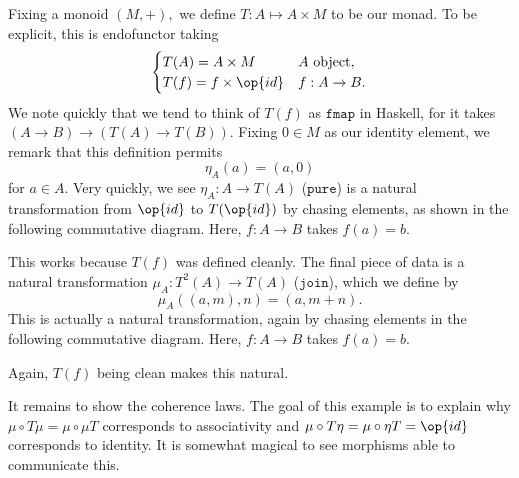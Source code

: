 Fixing a monoid $(M,+),$ we define $T:A\mapsto A\times M$ to be our monad. To be explicit, this is endofunctor taking
\[\begin{cases}
    T(A)=A\times M & A\text{ object}, \\
    T(f)=f\times\op{id} & f:A\to B.
\end{cases}\]
We note quickly that we tend to think of $T(f)$ as $\texttt{fmap}$ in Haskell, for it takes $(A\to B)\to(T(A)\to T(B)).$ Fixing $0\in M$ as our identity element, we remark that this definition permits
\[\eta_A(a)=(a,0)\]
for $a\in A.$ Very quickly, we see $\eta_A:A\to T(A)$ ($\texttt{pure}$) is a natural transformation from $\op{id}$ to $T(\op{id})$ by chasing elements, as shown in the following commutative diagram. Here, $f:A\to B$ takes $f(a)=b.$
\begin{center}
\end{center}
This works because $T(f)$ was defined cleanly. The final piece of data is a natural transformation $\mu_A:T^2(A)\to T(A)$ ($\texttt{join}$), which we define by
\[\mu_A((a,m),n)=(a,m+n).\]
This is actually a natural transformation, again by chasing elements in the following commutative diagram. Here, $f:A\to B$ takes $f(a)=b.$
\begin{center}
\end{center}
Again, $T(f)$ being clean makes this natural.

It remains to show the coherence laws. The goal of this example is to explain why $\mu\circ T\mu=\mu\circ\mu T$ corresponds to associativity and $\mu\circ T\eta=\mu\circ\eta T=\op{id}$ corresponds to identity. It is somewhat magical to see morphisms able to communicate this.

